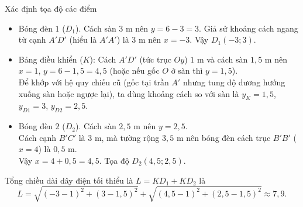 \begin{ex}
{{\begin{tikzpicture}[scale=0.7, font=\footnotesize, line join=round, line cap=round, >=stealth]
\end{tikzpicture}	
	}
		Xác định tọa độ các điểm
		\begin{itemize}
			\item Bóng đèn $1$ ($D_1$). Cách sàn $3$ m nên $y = 6 - 3 = 3$. Giả sử khoảng cách ngang từ cạnh $A'D'$ (hiểu là $A'A'$) là $3$ m nên $ x = -3$. Vậy $D_1(-3; 3)$.
			\item Bảng điều khiển ($K$): Cách $A'D'$ (tức trục $Oy$) $1$ m và cách sàn $1{,}5$ m nên $x = 1$, $y = 6 - 1{,}5 = 4{,}5$ (hoặc nếu gốc $O$ ở sàn thì $y=1{,}5$).\\
			 Để khớp với hệ quy chiếu cũ (gốc tại trần $A'$ nhưng tung độ dương hướng xuống sàn hoặc ngược lại), ta dùng khoảng cách so với sàn là $y_K=1{,}5$, $y_{D1}=3$, $y_{D2}=2{,}5$.
			\item Bóng đèn $2$ ($D_2$). Cách sàn $2{,}5$ m nên $y = 2{,}5$.\\
			 Cách cạnh $B'C'$ là $3$ m, mà tường rộng $3{,}5$ m nên bóng đèn cách trục $B'B'$ ($x=4$) là $0{,}5$ m.\\
			  Vậy $x = 4 + 0{,}5 = 4{,}5$.
			  Tọa độ $D_2(4{,}5; 2{,}5)$.
		\end{itemize}
		Tổng chiều dài dây điện tối thiểu là $L = KD_1 + KD_2$ là 
		\[ L = \sqrt{(-3-1)^2 + (3-1{,}5)^2} + \sqrt{(4{,}5-1)^2 + (2{,}5-1{,}5)^2}  \approx 7{,}9. \]
	}
\end{ex}

